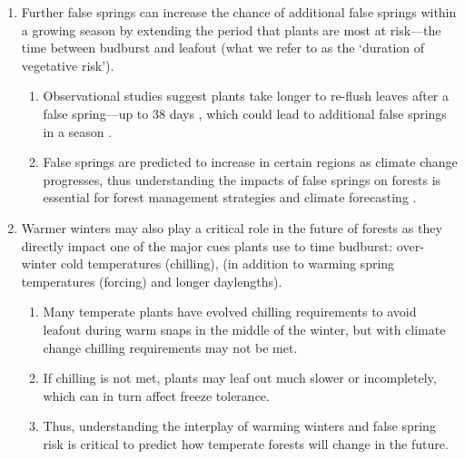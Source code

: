 \documentclass{article}\usepackage[]{graphicx}\usepackage[]{color}
\begin{document}
\begin{enumerate}
\item Further false springs can increase the chance of additional false springs within a growing season by extending the period that plants are most at risk---the time between budburst and leafout (what we refer to as the `duration of vegetative risk'). 
  \begin{enumerate}
  \item Observational studies suggest plants take longer to re-flush leaves after a false spring---up to 38 days \citep{Augspurger2009, Augspurger2013, Gu2008, Menzel2015}, which could lead to additional false springs in a season \citep{Augspurger2009}. 
  \item False springs are predicted to increase in certain regions as climate change progresses, thus understanding the impacts of false springs on forests is essential for forest management strategies and climate forecasting \citep{OBrien2019}.
  \end{enumerate}
  
\item Warmer winters may also play a critical role in the future of forests as they directly impact one of the  major cues plants use to time budburst: over-winter cold temperatures (chilling), (in addition to warming spring temperatures (forcing) and longer daylengths).
  \begin{enumerate}
  \item Many temperate plants have evolved chilling requirements to avoid leafout during warm snaps in the middle of the winter, but with climate change chilling requirements may not be met. 
  \item  If chilling is not met, plants may leaf out much slower or incompletely, which can in turn affect freeze tolerance. 
  \item Thus, understanding the interplay of warming winters and false spring risk is critical to predict how temperate forests will change in the future.
  \end{enumerate} 
  

\end{enumerate}
\end{document}
